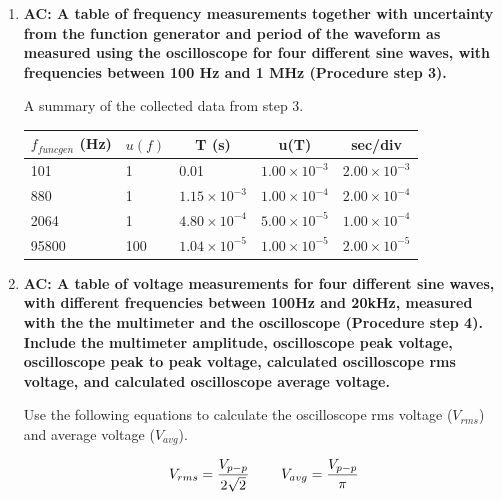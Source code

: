 \begin{enumerate}[resume]
\item {\bf AC: A table of frequency measurements together with uncertainty from the function generator and period of the waveform as measured using the oscilloscope for four different sine waves, with frequencies between 100 Hz and 1 MHz (Procedure step 3).}\newline

A summary of the collected data from step 3.

\begin{table}[ht]
\center
\begin{tabular}{|l|l|l|l|l|}
\hline
\multicolumn{1}{|c|}{$f_{func gen}$ (Hz)} & \multicolumn{1}{c|}{$u(f)$} & \multicolumn{1}{c|}{T (s)} & \multicolumn{1}{c|}{u(T)} & \multicolumn{1}{c|}{sec/div} \\ \hline
101                                       & 1                           & 0.01                       & $1.00\times10^{-3}$       & $2.00\times10^{-3}$          \\ \hline
880                                       & 1                           & $1.15\times10^{-3}$        & $1.00\times10^{-4}$       & $2.00\times10^{-4}$          \\ \hline
2064                                      & 1                           & $4.80\times10^{-4}$        & $5.00\times10^{-5}$       & $1.00\times10^{-4}$          \\ \hline
95800                                     & 100                         & $1.04\times10^{-5}$        & $1.00\times10^{-5}$       & $2.00\times10^{-5}$          \\ \hline
\end{tabular}
\label{tab:accg4}
\end{table}

\item {\bf AC: A table of voltage measurements for four different sine waves, with different frequencies between 100Hz and 20kHz, measured with the the multimeter and the oscilloscope (Procedure step 4). Include the multimeter amplitude, oscilloscope peak voltage, oscilloscope peak to peak voltage, calculated oscilloscope rms voltage, and calculated oscilloscope average voltage.}\newline

Use the following equations to calculate the oscilloscope rms voltage ($V_{rms}$) and average voltage ($V_{avg}$).

\begin{equation*}
V_{rms}=\dfrac{V_{p-p}}{2\sqrt{2}}\hspace{8mm} V_{avg}=\dfrac{V_{p-p}}{\pi}
\label{equ:accg2}
\end{equation*}


\end{enumerate}
